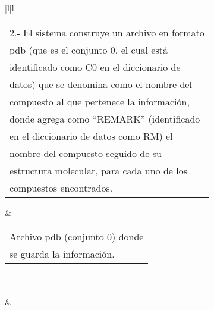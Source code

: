 \begin{longtable}{|l|l|}
\begin{tabular}[c]{@{}l@{}}2.- El sistema construye un archivo en formato\\ pdb (que es el conjunto 0, el cual está\\ identificado como C0 en el diccionario de\\ datos) que se denomina como el nombre del\\ compuesto al que pertenece la información,\\ donde agrega como “REMARK” (identificado\\ en el diccionario de datos como RM) el\\ nombre del compuesto seguido de su\\ estructura molecular, para cada uno de los\\ compuestos encontrados.\end{tabular} & \begin{tabular}[c]{@{}l@{}}Archivo pdb (conjunto 0) donde\\ se guarda la información.\end{tabular}             \\ \hline
{}                                                                                                                                                                                                                                                                                                                                                  \\ \hline
{}                                                                                                                                                                                                                                                                 &                                                                                          \\ \hline
{}                                                                                                                                                                                                                                                                                                                     \\ \hline
{}                                                                                                                                                                               \\ \hline

\end{longtable}
